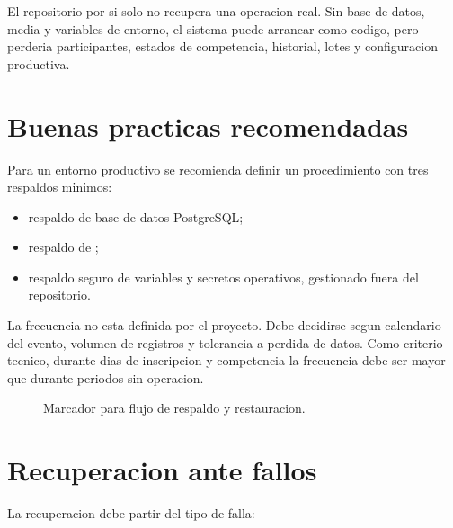 El repositorio por si solo no recupera una operacion real. Sin base de datos, media y variables de entorno, el sistema puede arrancar como codigo, pero perderia participantes, estados de competencia, historial, lotes y configuracion productiva.

\section{Buenas practicas recomendadas}
\label{sec:respaldo-buenas-practicas}

Para un entorno productivo se recomienda definir un procedimiento con tres respaldos minimos:

\begin{itemize}
  \item respaldo de base de datos PostgreSQL;
  \item respaldo de ;
  \item respaldo seguro de variables y secretos operativos, gestionado fuera del repositorio.
\end{itemize}

La frecuencia no esta definida por el proyecto. Debe decidirse segun calendario del evento, volumen de registros y tolerancia a perdida de datos. Como criterio tecnico, durante dias de inscripcion y competencia la frecuencia debe ser mayor que durante periodos sin operacion.

\begin{figure}[H]
  \centering
  \caption{Marcador para flujo de respaldo y restauracion.}
  \label{fig:respaldo-flujo}
\end{figure}

\section{Recuperacion ante fallos}
\label{sec:respaldo-recuperacion-fallos}

La recuperacion debe partir del tipo de falla:

